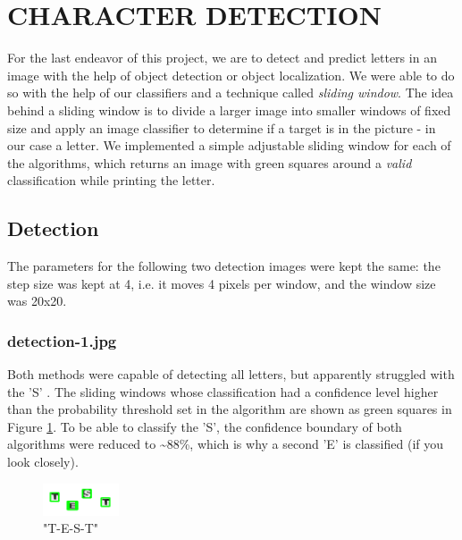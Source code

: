 \section{CHARACTER DETECTION}

For the last endeavor of this project, we are to detect and predict letters in an image with the help of object detection or object localization. We were able to do so with the help of our classifiers and a technique called \textit{sliding window}. The idea behind a sliding window is to divide a larger image into smaller windows of fixed size and apply an image classifier to determine if a target is in the picture - in our case a letter. We implemented a simple adjustable sliding window for each of the algorithms, which returns an image with green squares around a \textit{valid} classification while printing the letter.

\subsection{Detection}
The parameters for the following two detection images were kept the same: the step size was kept at 4, i.e. it moves 4 pixels per window, and the window size was 20x20.

\subsubsection{detection-1.jpg}
Both methods were capable of detecting all letters, but apparently struggled with the 'S' . The sliding windows whose classification had a confidence level higher than the probability threshold set in the algorithm are shown as green squares in Figure \ref{fig:svm_detect}. To be able to classify the 'S', the confidence boundary of both algorithms were reduced to \textasciitilde 88\%, which is why a second 'E' is classified (if you look closely).

\begin{figure}[H]
    \centering
    \includegraphics[width=0.2\textwidth]{pictures/svm_pred.png}
    \caption{"T-E-S-T"}
    \label{fig:svm_detect}
\end{figure}

